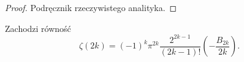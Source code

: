 \begin{proof}
	Podręcznik rzeczywistego analityka.	%
\end{proof}

\begin{fakt}
	Zachodzi równość \[\zeta(2k) = (-1)^k \pi^{2k} \frac{2^{2k-1}}{(2k-1)!} \left(-\frac{B_{2k}}{2k}\right).\]
\end{fakt}

